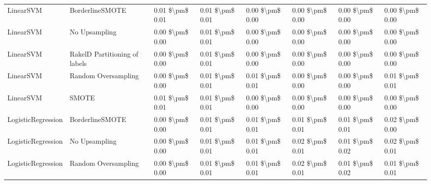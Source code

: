 \begin{tabular}{llllllll}
                      LinearSVM &               BorderlineSMOTE & 0.01 \$\textbackslash pm\$ 0.01 &           0.01 \$\textbackslash pm\$ 0.01 &       0.00 \$\textbackslash pm\$ 0.00 &        0.00 \$\textbackslash pm\$ 0.00 &                         0.00 \$\textbackslash pm\$ 0.00 &     0.00 \$\textbackslash pm\$ 0.00 \\
                      LinearSVM &                 No Upsampling & 0.00 \$\textbackslash pm\$ 0.00 &           0.01 \$\textbackslash pm\$ 0.01 &       0.00 \$\textbackslash pm\$ 0.00 &        0.00 \$\textbackslash pm\$ 0.00 &                         0.00 \$\textbackslash pm\$ 0.00 &     0.00 \$\textbackslash pm\$ 0.00 \\
                      LinearSVM & RakelD Partitioning of labels & 0.00 \$\textbackslash pm\$ 0.00 &           0.01 \$\textbackslash pm\$ 0.01 &       0.00 \$\textbackslash pm\$ 0.00 &        0.00 \$\textbackslash pm\$ 0.00 &                         0.00 \$\textbackslash pm\$ 0.00 &     0.00 \$\textbackslash pm\$ 0.00 \\
                      LinearSVM &           Random Oversampling & 0.00 \$\textbackslash pm\$ 0.00 &           0.01 \$\textbackslash pm\$ 0.01 &       0.01 \$\textbackslash pm\$ 0.01 &        0.00 \$\textbackslash pm\$ 0.00 &                         0.00 \$\textbackslash pm\$ 0.00 &     0.01 \$\textbackslash pm\$ 0.01 \\
                      LinearSVM &                         SMOTE & 0.01 \$\textbackslash pm\$ 0.01 &           0.01 \$\textbackslash pm\$ 0.01 &       0.00 \$\textbackslash pm\$ 0.00 &        0.00 \$\textbackslash pm\$ 0.00 &                         0.00 \$\textbackslash pm\$ 0.00 &     0.00 \$\textbackslash pm\$ 0.00 \\
             LogisticRegression &               BorderlineSMOTE & 0.00 \$\textbackslash pm\$ 0.00 &           0.01 \$\textbackslash pm\$ 0.01 &       0.01 \$\textbackslash pm\$ 0.01 &        0.01 \$\textbackslash pm\$ 0.01 &                         0.01 \$\textbackslash pm\$ 0.01 &     0.02 \$\textbackslash pm\$ 0.00 \\
             LogisticRegression &                 No Upsampling & 0.00 \$\textbackslash pm\$ 0.00 &           0.01 \$\textbackslash pm\$ 0.01 &       0.01 \$\textbackslash pm\$ 0.01 &        0.02 \$\textbackslash pm\$ 0.01 &                         0.01 \$\textbackslash pm\$ 0.02 &     0.02 \$\textbackslash pm\$ 0.01 \\
             LogisticRegression &           Random Oversampling & 0.00 \$\textbackslash pm\$ 0.00 &           0.01 \$\textbackslash pm\$ 0.01 &       0.01 \$\textbackslash pm\$ 0.01 &        0.02 \$\textbackslash pm\$ 0.01 &                         0.01 \$\textbackslash pm\$ 0.02 &     0.01 \$\textbackslash pm\$ 0.01 \\

\end{tabular}
